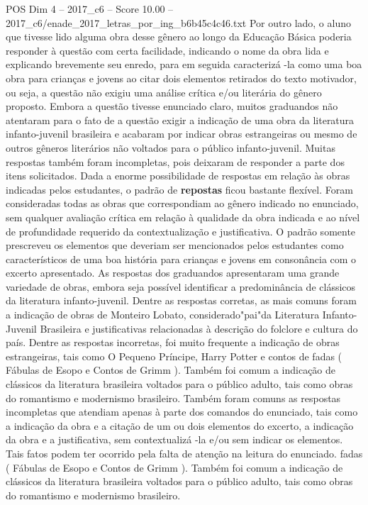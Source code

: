 \begin{textsample}{POS Dim 4 – 2017\_c6 – Score 10.00 – 2017\_c6/enade\_2017\_letras\_por\_ing\_b6b45c4c46.txt}
Por outro lado, o aluno que tivesse lido alguma obra desse gênero ao longo da Educação Básica poderia responder à questão com certa facilidade, indicando o nome da obra lida e explicando brevemente seu enredo, para em seguida caracterizá -la como uma boa obra para crianças e jovens ao citar dois elementos retirados do texto motivador, ou seja, a questão não exigiu uma análise crítica e/ou literária do gênero proposto.
Embora a questão tivesse enunciado claro, muitos graduandos não atentaram para o fato de a questão exigir a indicação de uma obra da literatura infanto-juvenil brasileira e acabaram por indicar obras estrangeiras ou mesmo de outros gêneros literários não voltados para o público infanto-juvenil.
Muitas respostas também foram incompletas, pois deixaram de responder a parte dos itens solicitados.
Dada a enorme possibilidade de respostas em relação às obras indicadas pelos estudantes, o padrão de \textbf{repostas} ficou bastante flexível.
Foram consideradas todas as obras que correspondiam ao gênero indicado no enunciado, sem qualquer avaliação crítica em relação à qualidade da obra indicada e ao nível de profundidade requerido da contextualização e justificativa.
O padrão somente prescreveu os elementos que deveriam ser mencionados pelos estudantes como característicos de uma boa história para crianças e jovens em consonância com o excerto apresentado.
As respostas dos graduandos apresentaram uma grande variedade de obras, embora seja possível identificar a predominância de clássicos da literatura infanto-juvenil.
Dentre as respostas corretas, as mais comuns foram a indicação de obras de Monteiro Lobato, considerado"pai"da Literatura Infanto-Juvenil Brasileira e justificativas relacionadas à descrição do folclore e cultura do país.
Dentre as respostas incorretas, foi muito frequente a indicação de obras estrangeiras, tais como O Pequeno Príncipe, Harry Potter e contos de fadas ( Fábulas de Esopo e Contos de Grimm ).
Também foi comum a indicação de clássicos da literatura brasileira voltados para o público adulto, tais como obras do romantismo e modernismo brasileiro.
Também foram comuns as respostas incompletas que atendiam apenas à parte dos comandos do enunciado, tais como a indicação da obra e a citação de um ou dois elementos do excerto, a indicação da obra e a justificativa, sem contextualizá -la e/ou sem indicar os elementos.
Tais fatos podem ter ocorrido pela falta de atenção na leitura do enunciado. fadas ( Fábulas de Esopo e Contos de Grimm ).
Também foi comum a indicação de clássicos da literatura brasileira voltados para o público adulto, tais como obras do romantismo e modernismo brasileiro.

\end{textsample}
